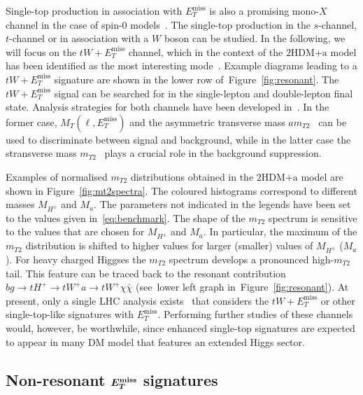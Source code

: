 \documentclass[a4paper, 11pt,notoc]{article}
\newcommand{\MET}{\ensuremath{E_T^\mathrm{miss}}\xspace}
\newcommand{\ma}{\ensuremath{M_{a}}\xspace}
\newcommand{\mHc}{\ensuremath{M_{H^{\pm}}}\xspace}
\newcommand{\hdma}{\ensuremath{\textrm{2HDM+a}}\xspace}
\def\bm#1{\mbox{\boldmath$#1$\unboldmath}}
\begin{document}
Single-top production in association with $\MET$ is also a promising mono-$X$ channel in the case of spin-0 models~\cite{Pinna:2017tay,Pani:2017qyd,Plehn:2017bys}. The single-top production in the $s$-channel, $t$-channel  or  in association with a $W$ boson can be studied. In the following, we will focus on the $tW + \MET$ channel, which in the context of the \hdma model has been identified as the most interesting mode~\cite{Pani:2017qyd}. Example diagrams leading to a $tW + \MET$ signature are shown in the lower row of~Figure~\ref{fig:resonant}. The $tW + \MET$ signal can be searched for in the single-lepton and double-lepton final state. Analysis strategies for both channels have been developed in~\cite{Pani:2017qyd}. In the former case, $M_T (\ell, \MET)$ and the asymmetric transverse mass $am_{T2}$~\cite{Konar:2009qr,Lester:2014yga} can be used to discriminate between signal and background, while in the latter case the stransverse mass $m_{T2}$~\cite{Lester:1999tx,Barr:2003rg} plays a crucial role in the background suppression.

Examples of normalised $m_{T2}$ distributions obtained in the \hdma model are shown in Figure~\ref{fig:mt2spectra}. The coloured histograms correspond to different masses $\mHc$ and $\ma$. The parameters not indicated in the legends have been set to the values given in~\eqref{eq:benchmark}. The shape of the $m_{T2}$ spectrum is sensitive to the values that are chosen for $\mHc$ and $\ma$. In particular, the maximum of the $m_{T2}$ distribution is shifted to higher values for larger (smaller) values of $\mHc$ ($\ma$). For heavy charged Higgses the $m_{T2}$ spectrum develops a pronounced high-$m_{T2}$ tail.  This feature can be traced back to the resonant contribution $b g \to t H^+  \to  t W^+ a  \to t W^+ \chi \bar \chi$ (see~lower left graph in~Figure~\ref{fig:resonant}).  At present, only a single LHC analysis exists~\cite{CMS-PAS-EXO-18-010}  that considers the $tW + \MET$  or other single-top-like signatures with $\MET$. Performing further studies of these channels would, however, be worthwhile, since enhanced single-top signatures are expected to appear in many DM model that features an extended Higgs sector. 

\subsection[Non-resonant $E_T^{\rm miss}$ signatures]{Non-resonant $\bm{E_T^{\rm miss}}$ signatures}
\label{sec:nonresonant}
\end{document}
